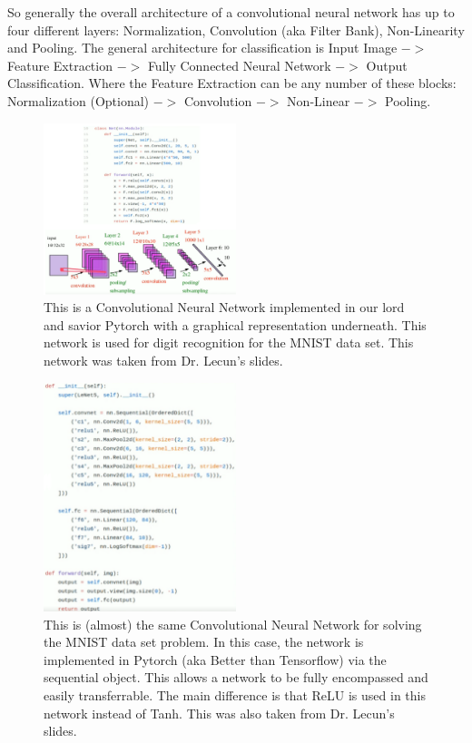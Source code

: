 \documentclass{article}
\begin{document}
\vspace{3mm}

\noindent So generally the overall architecture of a convolutional neural network has up to four different layers: Normalization, Convolution (aka Filter Bank), Non-Linearity and Pooling.
The general architecture for classification is Input Image $->$ Feature Extraction $->$ Fully Connected Neural Network $->$ Output Classification. 
Where the Feature Extraction can be any number of these blocks: Normalization (Optional) $->$ Convolution $->$ Non-Linear $->$ Pooling.

\vspace{3mm}

\begin{figure}[ht!]
  \centering
      \includegraphics[width=0.5\textwidth]{PytorchCNN.png}
          \caption{
            This is a Convolutional Neural Network implemented in our lord and savior Pytorch with a graphical representation underneath.
            This network is used for digit recognition for the MNIST data set.
            This network was taken from Dr. Lecun's slides.
          }
\end{figure}

\vspace{3mm}

\begin{figure}[ht!]
  \centering
      \includegraphics[width=0.5\textwidth]{PytorchCNNSeq.png}
          \caption{
            This is (almost) the same Convolutional Neural Network for solving the MNIST data set problem.
            In this case, the network is implemented in Pytorch (aka Better than Tensorflow) via the sequential object.
            This allows a network to be fully encompassed and easily transferrable.
            The main difference is that ReLU is used in this network instead of Tanh.
            This was also taken from Dr. Lecun's slides.
          }
\end{figure}
\end{document}
